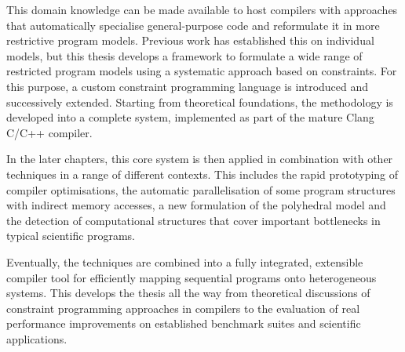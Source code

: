     This domain knowledge can be made available to host compilers with
    approaches that automatically specialise general-purpose code and
    reformulate it in more restrictive program models.
    Previous work has established this on individual models, but this thesis
    develops a framework to formulate a wide range of restricted program models
    using a systematic approach based on constraints.
    For this purpose, a custom constraint programming language is introduced
    and successively extended.
    Starting from theoretical foundations, the methodology is developed into
    a complete system, implemented as part of the mature Clang C/C++ compiler.

    In the later chapters, this core system is then applied in combination
    with other techniques in a range of different contexts.
    This includes the rapid prototyping of compiler optimisations, the
    automatic parallelisation of some program structures with indirect memory
    accesses, a new formulation of the polyhedral model and the detection of
    computational structures that cover important bottlenecks in typical
    scientific programs.

    Eventually, the techniques are combined into a fully integrated, extensible
    compiler tool for efficiently mapping sequential programs onto heterogeneous
    systems.
    This develops the thesis all the way from theoretical discussions of
    constraint programming approaches in compilers to the evaluation of real
    performance improvements on established benchmark suites and scientific
    applications.









